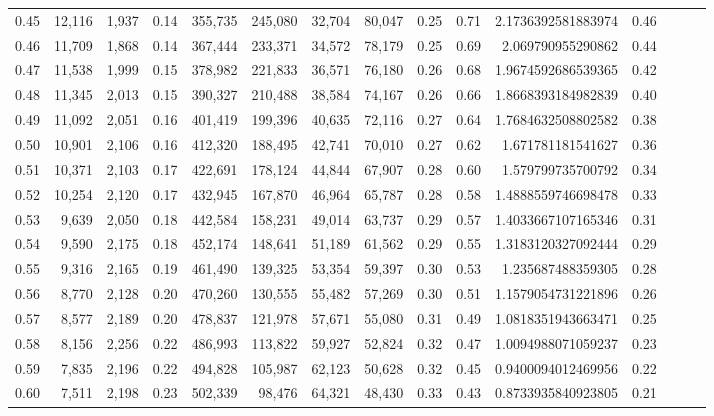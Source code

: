 \begin{tabular}{rrrrrrrrrrrrrrr}
0.45 &  12,116 &  1,937 &  0.14 &  355,735 &  245,080 &   32,704 &   80,047 &  0.25 &  0.71 &     2.1736392581883974 &      0.46 \\
0.46 &  11,709 &  1,868 &  0.14 &  367,444 &  233,371 &   34,572 &   78,179 &  0.25 &  0.69 &      2.069790955290862 &      0.44 \\
0.47 &  11,538 &  1,999 &  0.15 &  378,982 &  221,833 &   36,571 &   76,180 &  0.26 &  0.68 &     1.9674592686539365 &      0.42 \\
0.48 &  11,345 &  2,013 &  0.15 &  390,327 &  210,488 &   38,584 &   74,167 &  0.26 &  0.66 &     1.8668393184982839 &      0.40 \\
0.49 &  11,092 &  2,051 &  0.16 &  401,419 &  199,396 &   40,635 &   72,116 &  0.27 &  0.64 &     1.7684632508802582 &      0.38 \\
0.50 &  10,901 &  2,106 &  0.16 &  412,320 &  188,495 &   42,741 &   70,010 &  0.27 &  0.62 &      1.671781181541627 &      0.36 \\
0.51 &  10,371 &  2,103 &  0.17 &  422,691 &  178,124 &   44,844 &   67,907 &  0.28 &  0.60 &      1.579799735700792 &      0.34 \\
0.52 &  10,254 &  2,120 &  0.17 &  432,945 &  167,870 &   46,964 &   65,787 &  0.28 &  0.58 &     1.4888559746698478 &      0.33 \\
0.53 &   9,639 &  2,050 &  0.18 &  442,584 &  158,231 &   49,014 &   63,737 &  0.29 &  0.57 &     1.4033667107165346 &      0.31 \\
0.54 &   9,590 &  2,175 &  0.18 &  452,174 &  148,641 &   51,189 &   61,562 &  0.29 &  0.55 &     1.3183120327092444 &      0.29 \\
0.55 &   9,316 &  2,165 &  0.19 &  461,490 &  139,325 &   53,354 &   59,397 &  0.30 &  0.53 &      1.235687488359305 &      0.28 \\
0.56 &   8,770 &  2,128 &  0.20 &  470,260 &  130,555 &   55,482 &   57,269 &  0.30 &  0.51 &     1.1579054731221896 &      0.26 \\
0.57 &   8,577 &  2,189 &  0.20 &  478,837 &  121,978 &   57,671 &   55,080 &  0.31 &  0.49 &     1.0818351943663471 &      0.25 \\
0.58 &   8,156 &  2,256 &  0.22 &  486,993 &  113,822 &   59,927 &   52,824 &  0.32 &  0.47 &     1.0094988071059237 &      0.23 \\
0.59 &   7,835 &  2,196 &  0.22 &  494,828 &  105,987 &   62,123 &   50,628 &  0.32 &  0.45 &     0.9400094012469956 &      0.22 \\
0.60 &   7,511 &  2,198 &  0.23 &  502,339 &   98,476 &   64,321 &   48,430 &  0.33 &  0.43 &     0.8733935840923805 &      0.21 \\

\end{tabular}
